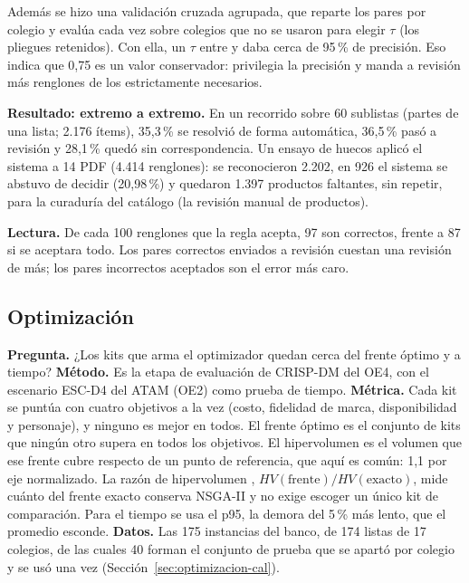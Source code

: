 Además se hizo una validación cruzada agrupada, que reparte los pares por colegio y evalúa cada vez
sobre colegios que no se usaron para elegir $\tau$ (los pliegues retenidos). Con ella, un $\tau$ entre
\calTauCVMin{} y \calTauCVMax{} daba cerca de 95\,\% de precisión. Eso indica que 0,75 es un valor
conservador: privilegia la precisión y manda a revisión más renglones de los estrictamente necesarios.

\textbf{Resultado: extremo a extremo.} En un recorrido sobre 60 sublistas (partes de una lista; 2.176
ítems), 35,3\,\% se resolvió de forma automática, 36,5\,\% pasó a revisión y 28,1\,\% quedó sin
correspondencia. Un ensayo de huecos aplicó el sistema a 14 PDF (4.414 renglones): se reconocieron
2.202, en 926 el sistema se abstuvo de decidir (20,98\,\%) y quedaron 1.397 productos faltantes, sin
repetir, para la curaduría del catálogo (la revisión manual de productos).

\textbf{Lectura.} De cada 100 renglones que la regla acepta, 97 son correctos, frente a 87 si se
aceptara todo. Los \calTauFN{} pares correctos enviados a revisión cuestan una revisión de más; los
\calTauFP{} pares incorrectos aceptados son el error más caro.

\subsection{Optimización}
\label{sec:optimizacion}

\textbf{Pregunta.} ¿Los kits que arma el optimizador quedan cerca del frente óptimo y a tiempo?
\textbf{Método.} Es la etapa de evaluación de CRISP-DM del OE4, con el escenario ESC-D4 del ATAM
(OE2) como prueba de tiempo. \textbf{Métrica.} Cada kit se puntúa con cuatro objetivos a la vez (costo,
fidelidad de marca, disponibilidad y personaje), y ninguno es mejor en todos. El frente óptimo es el
conjunto de kits que ningún otro supera en todos los objetivos. El hipervolumen es el volumen que ese
frente cubre respecto de un punto de referencia, que aquí es común: 1,1 por eje normalizado. La razón de
hipervolumen \citep{zitzler_multiobjective_1999}, $HV(\text{frente})/HV(\text{exacto})$, mide cuánto del
frente exacto conserva NSGA-II y no exige escoger un único kit de comparación. Para el tiempo se usa el
p95, la demora del 5\,\% más lento, que el promedio esconde. \textbf{Datos.} Las 175 instancias del banco, de 174 listas de 17 colegios, de las cuales 40 forman el
conjunto de prueba que se apartó por colegio y se usó una vez (Sección~\ref{sec:optimizacion-cal}).

